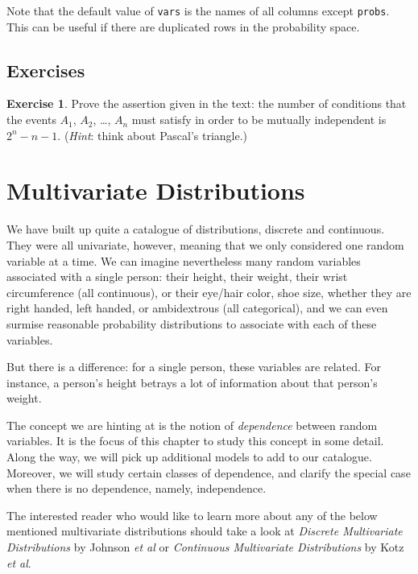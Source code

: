 \documentclass[]{book}
\numberwithin{equation}{chapter}
\numberwithin{figure}{chapter}
\theoremstyle{plain}
\theoremstyle{definition}
\newtheorem{xca}{Exercise}[chapter]
\theoremstyle{remark}
\theoremstyle{definition}
\theoremstyle{definition}
\theoremstyle{remark}
\begin{document}
Note that the default value of \texttt{vars} is the names of all columns
except \texttt{probs}. This can be useful if there are duplicated rows
in the probability space.

\section{Exercises}\label{exercises-2}

\bigskip

\begin{xca}
Prove the assertion given in the text: the number of conditions that the
events \(A_{1}\), \(A_{2}\), \ldots{}, \(A_{n}\) must satisfy in order
to be mutually independent is \(2^{n} - n - 1\). (\emph{Hint}: think
about Pascal's triangle.)
\end{xca}

\chapter{Multivariate
Distributions}\label{cha-multivariable-distributions}

We have built up quite a catalogue of distributions, discrete and
continuous. They were all univariate, however, meaning that we only
considered one random variable at a time. We can imagine nevertheless
many random variables associated with a single person: their height,
their weight, their wrist circumference (all continuous), or their
eye/hair color, shoe size, whether they are right handed, left handed,
or ambidextrous (all categorical), and we can even surmise reasonable
probability distributions to associate with each of these variables.

But there is a difference: for a single person, these variables are
related. For instance, a person's height betrays a lot of information
about that person's weight.

The concept we are hinting at is the notion of \emph{dependence} between
random variables. It is the focus of this chapter to study this concept
in some detail. Along the way, we will pick up additional models to add
to our catalogue. Moreover, we will study certain classes of dependence,
and clarify the special case when there is no dependence, namely,
independence.

The interested reader who would like to learn more about any of the
below mentioned multivariate distributions should take a look at
\emph{Discrete Multivariate Distributions} by Johnson \emph{et al}
\autocite{Johnson1997} or \emph{Continuous Multivariate Distributions}
\autocite{Kotz2000} by Kotz \emph{et al}.
\end{document}
